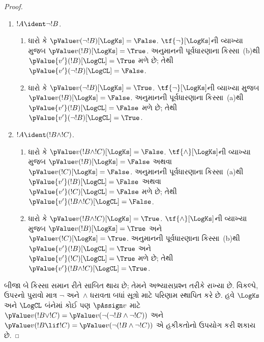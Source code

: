 \begin{proof}
\begin{enumerate}
    અનુમાનના પગલા માટે નીચેના કિસ્સા લો:
    \item $!A \ident \lnot !B$.
    \begin{enumerate}
      \item ધારો કે $\pValue v(\lnot!B)[\LogKs] = \False$.
      $\tf{\lnot}[\LogKs]$ની વ્યાખ્યા મુજબ
      $\pValue v(!B)[\LogKs] = \True$. અનુમાનની પૂર્વધારણાના
      કિસ્સા~(b)થી $\pValue {v'}(!B)[\LogCL] = \True$ મળે છે;
      તેથી $\pValue {v'}(\lnot !B)[\LogCL] = \False$.
      \item ધારો કે $\pValue v(\lnot!B)[\LogKs] = \True$.
      $\tf{\lnot}[\LogKs]$ની વ્યાખ્યા મુજબ
      $\pValue v(!B)[\LogKs] = \False$. અનુમાનની પૂર્વધારણાના
      કિસ્સા~(a)થી $\pValue {v'}(!B)[\LogCL] = \False$ મળે છે;
      તેથી $\pValue {v'}(\lnot !B)[\LogCL] = \True$.
    \end{enumerate}

    \item $!A \ident (!B \land !C)$.
    \begin{enumerate}
      \item ધારો કે $\pValue v(!B \land !C)[\LogKs] = \False$.
      $\tf{\land}[\LogKs]$ની વ્યાખ્યા મુજબ
      $\pValue v(!B)[\LogKs] = \False$ અથવા
      $\pValue v(!C)[\LogKs] = \False$. અનુમાનની પૂર્વધારણાના
      કિસ્સા~(a)થી $\pValue {v'}(!B)[\LogCL] = \False$
      અથવા $\pValue {v'}(!C)[\LogCL] = \False$ મળે છે; તેથી
      $\pValue {v'}(!B \land !C)[\LogCL] = \False$.
      \item ધારો કે $\pValue v(!B \land !C)[\LogKs] = \True$.
      $\tf{\land}[\LogKs]$ની વ્યાખ્યા મુજબ
      $\pValue v(!B)[\LogKs] = \True$ અને
      $\pValue v(!C)[\LogKs] = \True$. અનુમાનની પૂર્વધારણાના
      કિસ્સા~(b)થી $\pValue {v'}(!B)[\LogCL] = \True$
      અને $\pValue {v'}(!C)[\LogCL] = \True$ મળે છે; તેથી
      $\pValue {v'}(!B \land !C)[\LogCL] = \True$.
    \end{enumerate}
  \end{enumerate}

  બીજા બે કિસ્સા સમાન રીતે સાબિત થાય છે; તેમને અભ્યાસપ્રશ્ન તરીકે
  રાખ્યા છે. વિકલ્પે, ઉપરનો પુરાવો માત્ર $\lnot$ અને~$\land$
  ધરાવતા બધાં સૂત્રો માટે પરિણામ સ્થાપિત કરે છે. હવે
  $\LogKs$ અને $\LogCL$ બંનેમાં કોઈ પણ $\pAssign v$ માટે
  $\pValue v(!B \lor
  !C) = \pValue v(\lnot(\lnot!B \land \lnot !C))$ અને
  $\pValue v(!B \lif
  !C) = \pValue v(\lnot(!B \land \lnot !C))$ એ હકીકતોનો
  ઉપયોગ કરી શકાય છે.
\end{proof}

